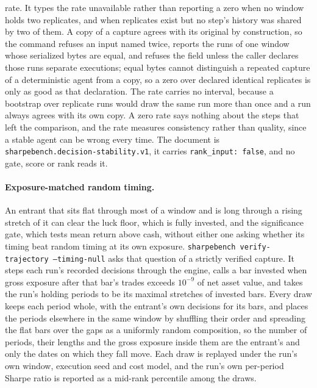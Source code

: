 rate. It types the rate unavailable rather than reporting a zero when no window holds two replicates, and when replicates exist but no step's history was shared by two of them. A copy of a capture agrees with its original by construction, so the command refuses an input named twice, reports the runs of one window whose serialized bytes are equal, and refuses the field unless the caller declares those runs separate executions; equal bytes cannot distinguish a repeated capture of a deterministic agent from a copy, so a zero over declared identical replicates is only as good as that declaration. The rate carries no interval, because a bootstrap over replicate runs would draw the same run more than once and a run always agrees with its own copy. A zero rate says nothing about the steps that left the comparison, and the rate measures consistency rather than quality, since a stable agent can be wrong every time. The document is \texttt{sharpebench.decision-stability.v1}, it carries \texttt{rank\_input: false}, and no gate, score or rank reads it.

\paragraph{Exposure-matched random timing.} An entrant that sits flat through most of a window and is long through a rising stretch of it can clear the luck floor, which is fully invested, and the significance gate, which tests mean return above cash, without either one asking whether its timing beat random timing at its own exposure. \texttt{sharpebench verify-trajectory --timing-null} asks that question of a strictly verified capture. It steps each run's recorded decisions through the engine, calls a bar invested when gross exposure after that bar's trades exceeds $10^{-9}$ of net asset value, and takes the run's holding periods to be its maximal stretches of invested bars. Every draw keeps each period whole, with the entrant's own decisions for its bars, and places the periods elsewhere in the same window by shuffling their order and spreading the flat bars over the gaps as a uniformly random composition, so the number of periods, their lengths and the gross exposure inside them are the entrant's and only the dates on which they fall move. Each draw is replayed under the run's own window, execution seed and cost model, and the run's own per-period Sharpe ratio is reported as a mid-rank percentile among the draws.

